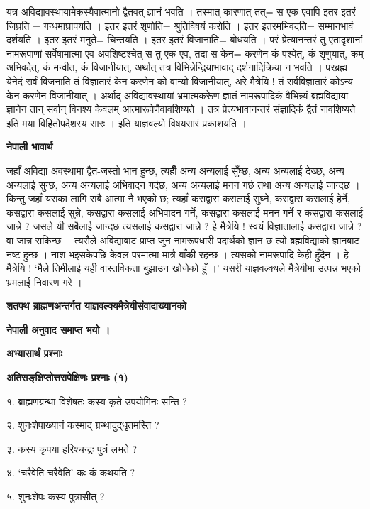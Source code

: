 \documentclass[11pt, a5paper]{article}
\begin{document}
यत्र अविद्यावस्थायामेकस्यैवात्मानो द्वैतवत् ज्ञानं भवति । तस्मात् कारणात्  तत्= स एक एवापि इतर इतरं जिघ्रति = गन्धमाघ्रापयति । इतर इतरं शृणोति= श्रुतिविषयं करोति । इतर इतरमभिवदति= सम्मानभावं दर्शयति । इतर इतरं मनुते= चिन्तयति । इतर इतरं विजानाति= बोधयति । परं प्रेत्यानन्तरं तु एतादृशानां नामरूपाणां सर्वेषामात्मा एव अवशिष्टश्चेत् स तु एक एव, तदा स केन= करणेन कं पश्येत्, कं शृणुयात्, कम् अभिवदेत्, कं मन्वीत, कं विजानीयात्, अर्थात् तत्र विभिन्नेन्द्रियाभावाद् दर्शनादिक्रिया न भवति । परब्रह्म येनेदं सर्वं विजनाति तं विज्ञातारं केन करणेन को वान्यो विजानीयात्, अरेे मैत्रेयि ! तं सर्वविज्ञातारं कोऽन्य केन करणेन विजानीयात् । अर्थाद् अविद्यावस्थायां भ्रमात्मकरूेण ज्ञातं नामरूपादिकं वैभिन्न्यं ब्रह्मविद्याया ज्ञानेन तान् सर्वान् विनश्य केवलम् आत्मारूपेणैवावशिष्यते । तत्र प्रेत्यभावानन्तरं  संज्ञादिकं द्वैतं नावशिष्यते इति मया विहितोपदेशस्य सारः । इति याज्ञवल्यो विषयसारं प्रकाशयति ।

\textbf{नेपाली भावार्थ}

जहाँ अविद्या अवस्थामा द्वैत-जस्तो भान हुन्छ, त्यहीँ अन्य अन्यलाई सुँघ्छ, अन्‍य अन्यलाई देख्छ, अन्य अन्यलाई सुन्छ, अन्य अन्यलाई अभिवादन गर्दछ, अन्य अन्यलाई मनन गर्छ तथा अन्य अन्यलाई जान्दछ । किन्तु जहाँ यसका लागि सबै आत्मा नै भएको छ; त्यहाँ कसद्वारा कसलाई सुघ्ने, कसद्वारा कसलाई हेर्ने, कसद्वारा कसलाई सुन्ने, कसद्वारा कसलाई अभिवादन गर्ने, कसद्वारा कसलाई मनन गर्ने र कसद्वारा कसलाई जान्ने ? जसले यी सबैलाई जान्दछ त्यसलाई कसद्वारा जान्ने ? हे मैत्रेयि ! स्वयं विज्ञातालाई कसद्वारा जान्ने ? वा जान्न सकिन्छ । त्यसैले अविद्याबाट प्राप्त जुन नामरूपधारी पदार्थको ज्ञान छ त्यो ब्रह्मविद्याको ज्ञानबाट नष्ट हुन्छ । नाश भइसकेपछि केवल परमात्मा मात्रै बाँकी रहन्छ । त्यसको नामरूपादि केही हुँदैन । हे मैत्रेयि ! ‘मैले तिमीलाई यही वास्तविकता बुझाउन खोजेको हुँ ।’ यसरी याज्ञवल्क्यले मैत्रेयीमा उत्पन्न भएको भ्रमलाई निवारण गरे ।

\textbf{शतपथ ब्राह्मणअन्तर्गत याज्ञवल्क्यमैत्रेयीसंवादाख्यानको}

\textbf{नेपाली अनुवाद समाप्त भयो ।}

\textbf{अभ्यासार्थं प्रश्नाः}

\textbf{अतिसङ्‌क्षिप्तोत्तरापेक्षिणः प्रश्नाः (१)}

१. ब्राह्मणग्रन्था विशेषतः कस्य कृते उपयोगिनः सन्ति ?

२. शुनःशेपाख्यानं कस्माद् ग्रन्थादुद्‌धृतमस्ति ?

३. कस्य कृपया हरिश्चन्द्रः पुत्रं लभते ?

४. ‘चरैवेति चरैवेति’ कः कं कथयति ?

५. शुनःशेपः कस्य पुत्रासीत् ?
\end{document}
